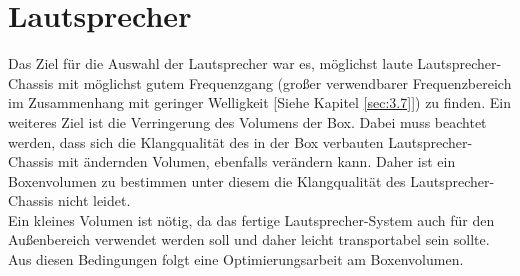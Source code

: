 \section{Lautsprecher}\label{subsec:2.1.2}
Das Ziel für die Auswahl der Lautsprecher war es, möglichst laute Lautsprecher-Chassis mit möglichst gutem Frequenzgang (großer verwendbarer Frequenzbereich im Zusammenhang mit geringer Welligkeit [Siehe Kapitel \ref{sec:3.7}]) zu finden.
Ein weiteres Ziel ist die Verringerung des Volumens der Box.
Dabei muss beachtet werden, dass sich die Klangqualität des in der Box verbauten Lautsprecher-Chassis mit ändernden Volumen, ebenfalls verändern kann.
Daher ist ein Boxenvolumen zu bestimmen unter diesem die Klangqualität des Lautsprecher-Chassis nicht leidet.\\
Ein kleines Volumen ist nötig, da das fertige Lautsprecher-System auch für den Außenbereich verwendet werden soll und daher leicht transportabel sein sollte.
Aus diesen Bedingungen folgt eine Optimierungsarbeit am Boxenvolumen.